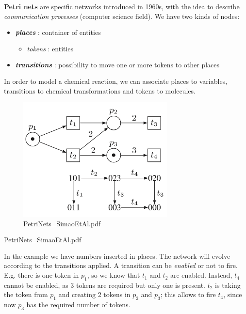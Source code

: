 \textbf{Petri nets} are specific networks introduced in 1960s, with the
idea to describe \emph{communication processes} (computer science
field). We have two kinds of nodes:

\begin{itemize}
\tightlist
\item
  \textbf{\emph{places}} : container of entities

  \begin{itemize}
  \tightlist
  \item
    \emph{tokens} : entities
  \end{itemize}
\item
  \textbf{\emph{transitions}} : possibility to move one or more tokens
  to other places
\end{itemize}

In order to model a chemical reaction, we can associate places to
variables, transitions to chemical transformations and tokens to
molecules.

\begin{figure}[h!]
\centering
\includegraphics[width=0.7\textwidth]{1_images/petri_nets.png}
\caption{PetriNets\_SimaoEtAl.pdf}
\end{figure}

PetriNets\_SimaoEtAl.pdf

In the example we have numbers inserted in places. The network will
evolve according to the transitions applied. A transition can be
\emph{enabled} or not to fire. E.g. there is one token in \(p_1\), so we
know that \(t_1\) and \(t_2\) are enabled. Instead, \(t_4\) cannot be
enabled, as 3 tokens are required but only one is present. \(t_2\) is
taking the token from \(p_1\) and creating 2 tokens in \(p_2\) and
\(p_3\); this allows to fire \(t_4\), since now \(p_3\) has the required
number of tokens.

